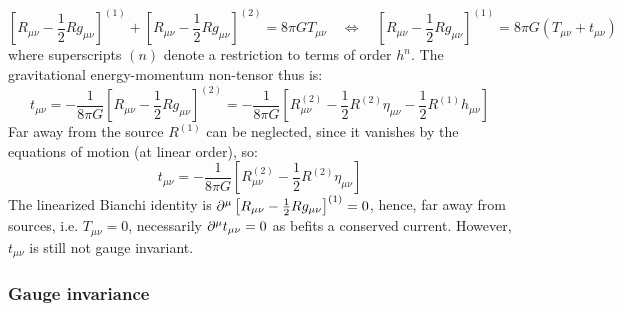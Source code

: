\begin{equation*}
  \left[ R_{\mu \nu} - \frac{1}{2} R g_{\mu \nu} \right]^{(1)} + \left[ R_{\mu \nu} - \frac{1}{2} R g_{\mu \nu} \right]^{(2)} = 8\pi G T_{\mu \nu}
  \quad \Leftrightarrow \quad
  \left[ R_{\mu \nu} - \frac{1}{2} R g_{\mu \nu} \right]^{(1)} = 8\pi G (T_{\mu \nu} + t_{\mu \nu})
\end{equation*}
where superscripts $ (n) $ denote a restriction to terms of order $ h^n $. The gravitational energy-momentum non-tensor thus is:
\begin{equation*}
  t_{\mu \nu} = - \frac{1}{8\pi G} \left[ R_{\mu \nu} - \frac{1}{2} R g_{\mu \nu} \right]^{(2)} = - \frac{1}{8\pi G} \left[ R^{(2)}_{\mu \nu} - \frac{1}{2} R^{(2)} \eta_{\mu \nu} - \frac{1}{2} R^{(1)} h_{\mu \nu} \right]
\end{equation*}
Far away from the source $ R^{(1)} $ can be neglected, since it vanishes by the equations of motion (at linear order), so:
\begin{equation}
  t_{\mu \nu} = - \frac{1}{8\pi G} \left[ R^{(2)}_{\mu \nu} - \frac{1}{2} R^{(2)} \eta_{\mu \nu} \right]
  \label{eq:5.30}
\end{equation}
The linearized Bianchi identity is $ \partial^\mu \left[ R_{\mu \nu} - \frac{1}{2} R g_{\mu \nu} \right]^{(1)} = 0 $, hence, far away from sources, i.e. $ T_{\mu \nu} = 0 $, necessarily $ \partial^\mu t_{\mu \nu} = 0 $ as befits a conserved current. However, $ t_{\mu \nu} $ is still not gauge invariant.

\subsubsection{Gauge invariance}

